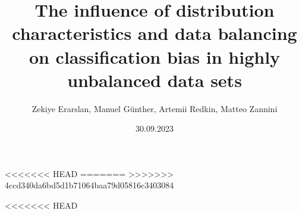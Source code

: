 \documentclass[11pt,a4paper]{article}
\title{\textbf{The influence of distribution characteristics and data balancing on classification bias in highly unbalanced data sets}}
\author{
        \parbox{\linewidth}{\centering
            Zekiye Erarslan, Manuel Günther, Artemii Redkin, Matteo Zannini
        }
     }
\date{30.09.2023}
\begin{document}

\maketitle
\tableofcontents








<<<<<<< HEAD
%
%
%
=======
>>>>>>> 4ccd340da6bd5d1b71064baa79d05816c3403084





\def\bibsection{\section{Reference}}

\clearpage



<<<<<<< HEAD



\end{document}
